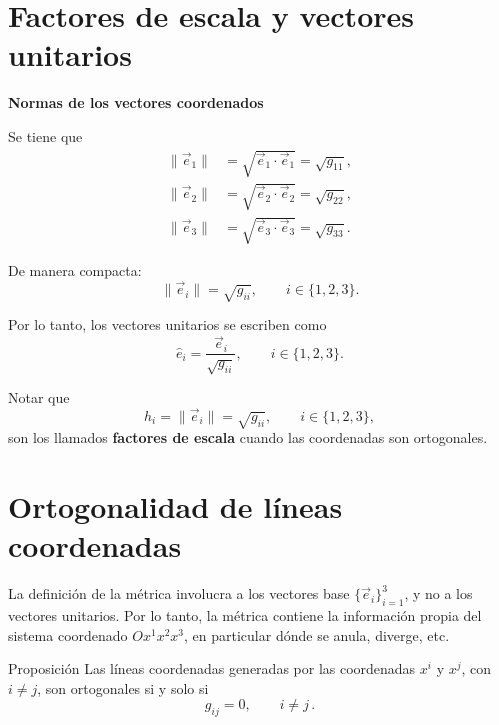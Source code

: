 \documentclass[../apunte_mecanica_clasica.tex]{subfiles}%
\begin{document}
\section{Factores de escala y vectores unitarios}

\begin{apuntebloque}{}

\textbf{Normas de los vectores coordenados}

Se tiene que
\begin{align*}
    \|\vec{e}_1\| &= \sqrt{\vec{e}_1 \cdot \vec{e}_1} = \sqrt{g_{11}},\\
    \|\vec{e}_2\| &= \sqrt{\vec{e}_2 \cdot \vec{e}_2} = \sqrt{g_{22}},\\
    \|\vec{e}_3\| &= \sqrt{\vec{e}_3 \cdot \vec{e}_3} = \sqrt{g_{33}}.
\end{align*}

De manera compacta:
\begin{equation*}
    \|\vec{e}_i\| = \sqrt{g_{ii}}, 
    \qquad i \in \{1,2,3\}.
\end{equation*}

Por lo tanto, los vectores unitarios se escriben como
\begin{equation*}
    \hat{e}_i = \frac{\vec{e}_i}{\sqrt{g_{ii}}},
    \qquad i \in \{1,2,3\}.
\end{equation*}

Notar que
\begin{equation*}
    h_i = \|\vec{e}_i\| = \sqrt{g_{ii}}, 
    \qquad i \in \{1,2,3\},
\end{equation*}
son los llamados \textbf{factores de escala} cuando las 
coordenadas son ortogonales.

\end{apuntebloque}

\section{Ortogonalidad de líneas coordenadas}

La definición de la métrica involucra a los vectores base 
$\{\vec{e}_i\}_{i=1}^3$, y no a los vectores unitarios. 
Por lo tanto, la métrica contiene la información propia 
del sistema coordenado $Ox^1x^2x^3$, en particular 
dónde se anula, diverge, etc.

\begin{apuntebloque}{Proposición}
Las líneas coordenadas generadas por las coordenadas $x^i$ y $x^j$, 
con $i \neq j$, son ortogonales si y solo si
\begin{equation*}
    g_{ij} = 0, \qquad i \neq j \,.
\end{equation*}
\end{apuntebloque}
\end{document}
